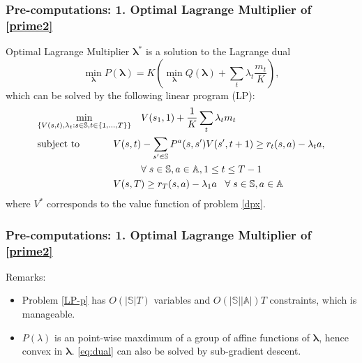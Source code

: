 \documentclass{beamer}
\newcommand{\lambdav}{\pmb{\lambda}}
\newcommand{\substates}{\mathbb{S}}
\newcommand{\subactions}{\mathbb{A}}
\begin{document}
\begin{frame}
\frametitle{Pre-computations: 1. Optimal Lagrange Multiplier of \eqref{prime2}}
Optimal Lagrange Multiplier $\lambdav^*$ is a solution to the Lagrange dual
\begin{equation}\label{eq:dual}
\min_{\lambdav} P(\lambdav) = K\left(\min_{\lambdav}Q(\lambdav)+\sum_t\lambda_t\frac{m_t}{K}\right),
\end{equation}
which can be solved by the following linear program (LP):
\small
\begin{equation}\label{LP-p}
\begin{aligned}
& \underset{\{V(s,t),\lambda_t:s\in\substates,t\in\{1,...,T\}\}}{\text{min}}
& & V(s_1,1)+\frac{1}{K}\sum_t \lambda_t m_t \\
& \text{subject to}
& & \hspace{-1cm}V(s,t)-\sum_{s'\in\substates}P^a(s,s')V(s',t+1)\geq r_t(s,a)-\lambda_ta, \\
& & &\forall\; s\in\substates,a\in\subactions,1\leq t\leq T-1\\
& & &\hspace{-1cm} V(s,T)\geq r_T(s,a)-\lambda_1a\;\;\;\forall\;s\in\substates,a\in\subactions
\end{aligned}
\end{equation}
\normalsize
where $V^*$ corresponds to the value function of problem \eqref{dpx}.
\end{frame}

\begin{frame}
\frametitle{Pre-computations: 1. Optimal Lagrange Multiplier of \eqref{prime2}}
Remarks:
\begin{itemize}
\item Problem \eqref{LP-p} has $O(|\substates|T)$ variables and $O(|\substates||\subactions|)T$ constraints, which is manageable.
\item $P(\lambda)$ is an point-wise maxdimum of a group of affine functions of $\lambdav$, hence convex in $\lambdav$. \eqref{eq:dual} can also be solved by sub-gradient descent.
\end{itemize}
\end{frame}
\end{document}
